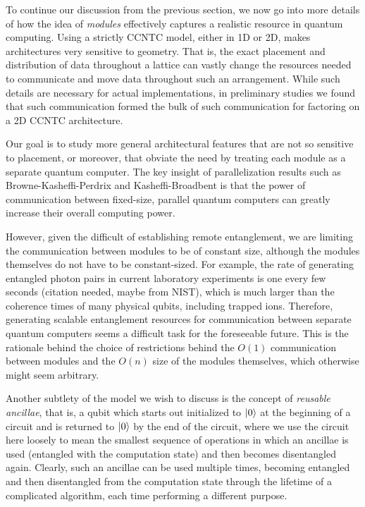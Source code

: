 \documentclass{article}
\begin{document}
To continue our discussion from the previous section, we now go into more
details of how the idea of \emph{modules} effectively captures a realistic
resource in quantum computing. Using a strictly CCNTC model, either in 1D
or 2D, makes architectures very sensitive to geometry. That is, the exact
placement and distribution of data throughout a lattice can vastly change
the resources needed to communicate and move data throughout such an
arrangement. While such details are necessary for actual implementations,
in preliminary studies we found that such communication formed the bulk of
such communication for factoring on a 2D CCNTC architecture.

Our goal is to study more general architectural features that are not so
sensitive to placement, or moreover, that obviate the need by treating
each module as a separate quantum computer. The key insight of
parallelization results such as Browne-Kasheffi-Perdrix and
Kasheffi-Broadbent is that the power of communication between fixed-size,
parallel quantum computers can greatly increase their overall computing
power.

However, given the difficult of establishing remote entanglement, we
are limiting the communication between modules to be of constant size,
although the modules themselves do not have to be constant-sized. For example,
the rate of generating entangled photon pairs in current laboratory
experiments is one every few seconds (citation needed, maybe from NIST),
which is much larger than the coherence times of many physical qubits,
including trapped ions. Therefore, generating scalable entanglement resources
for communication between separate quantum computers seems a difficult task
for the foreseeable future. This is the rationale behind the choice of
restrictions behind the $O(1)$ communication between modules and the
$O(n)$ size of the modules themselves, which otherwise might seem
arbitrary.

Another subtlety of the model we wish to discuss is the concept of
\emph{reusable ancillae}, that is, a qubit which starts out initialized to
$\left\vert{0}\right\rangle$ at the beginning of a circuit and is returned to $\left\vert{0}\right\rangle$ by the
end of the circuit, where we use the circuit here loosely to mean the
smallest sequence of operations in which an ancillae is used
(entangled with the computation state) and then becomes disentangled again.
Clearly, such an ancillae can be used multiple times, becoming entangled
and then disentangled from the computation state through the lifetime of a
complicated algorithm, each time performing a different purpose.
\end{document}
